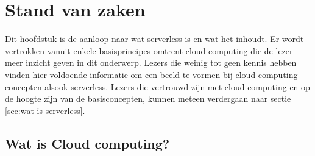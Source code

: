\chapter{Stand van zaken}
\label{ch:stand-van-zaken}



%
%

 Dit hoofdstuk is de aanloop naar wat serverless is en wat het inhoudt. Er wordt vertrokken vanuit enkele basisprincipes omtrent cloud computing die de lezer meer inzicht geven in dit onderwerp. Lezers die weinig tot geen kennis hebben vinden hier voldoende informatie om een beeld te vormen bij cloud computing concepten alsook serverless. Lezers die vertrouwd zijn met cloud computing en op de hoogte zijn van de basisconcepten, kunnen meteen verdergaan naar sectie \ref{sec:wat-is-serverless}.
 
\section{Wat is Cloud computing?}
\label{sec:wat-is-cloud-computing}
 

